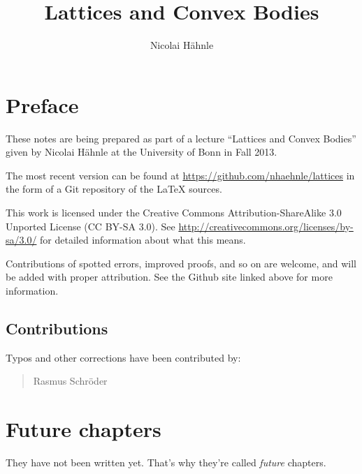\documentclass[a4paper,10pt]{scrbook}
\title{Lattices and Convex Bodies}
\author{Nicolai Hähnle}
\theoremstyle{plain}
\theoremstyle{definition}
\begin{document}
\maketitle

\tableofcontents

\chapter*{Preface}

These notes are being prepared as part of a lecture ``Lattices and Convex Bodies''
given by Nicolai Hähnle at the University of Bonn in Fall 2013.

The most recent version can be found at \url{https://github.com/nhaehnle/lattices}
in the form of a Git repository of the \LaTeX{} sources.

This work is licensed under the Creative Commons Attribution-ShareAlike 3.0
Unported License (CC BY-SA 3.0). See \url{http://creativecommons.org/licenses/by-sa/3.0/}
for detailed information about what this means.

Contributions of spotted errors, improved proofs, and so on are welcome,
and will be added with proper attribution.
See the Github site linked above for more information.


\section*{Contributions}

Typos and other corrections have been contributed by:
\begin{quote}
  Rasmus Schröder
\end{quote}










\chapter{Future chapters}
\label{chapter:not-yet}

They have not been written yet. That's why they're called \emph{future} chapters.





\end{document}
